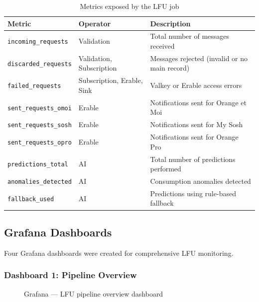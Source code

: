 \begin{table}[H]
    \centering
    \caption{Metrics exposed by the LFU job}
    \label{tab:runtime-metrics}
    \begin{tabularx}{\textwidth}{l l X}
\toprule
\textbf{Metric} & \textbf{Operator} & \textbf{Description} \\
\midrule
\texttt{incoming\_requests} & Validation & Total number of messages received \\
\texttt{discarded\_requests} & Validation, Subscription & Messages rejected (invalid or no main record) \\
\texttt{failed\_requests} & Subscription, Erable, Sink & Valkey or Erable access errors \\
\texttt{sent\_requests\_omoi} & Erable & Notifications sent for Orange et Moi \\
\texttt{sent\_requests\_sosh} & Erable & Notifications sent for My Sosh \\
\texttt{sent\_requests\_opro} & Erable & Notifications sent for Orange Pro \\
\texttt{predictions\_total} & AI & Total number of predictions performed \\
\texttt{anomalies\_detected} & AI & Consumption anomalies detected \\
\texttt{fallback\_used} & AI & Predictions using rule-based fallback \\
\bottomrule
    \end{tabularx}
\end{table}

\subsection{Grafana Dashboards}

Four Grafana dashboards were created for comprehensive LFU monitoring.

\subsubsection{Dashboard 1: Pipeline Overview}

\begin{figure}[H]
    \centering
    \caption{Grafana --- LFU pipeline overview dashboard}
    \label{fig:grafana-overview}
\end{figure}

